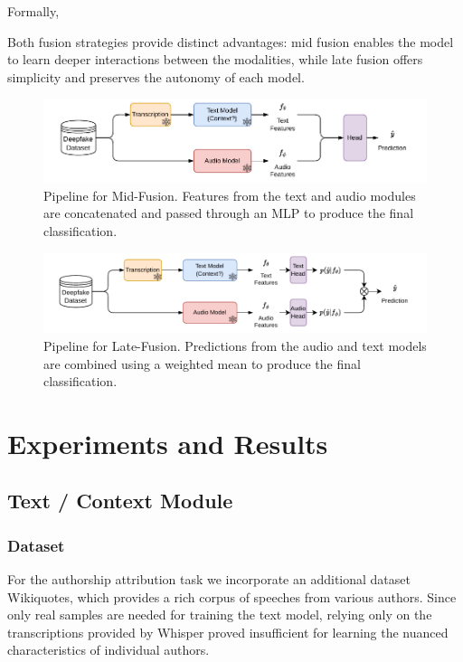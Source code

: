 \documentclass{Interspeech}
\begin{document}
Formally, 

Both fusion strategies provide distinct advantages: mid fusion enables the
model to learn deeper interactions between the modalities, while late fusion
offers simplicity and preserves the autonomy of each model.

\begin{figure}[t]
  \centering
  \includegraphics[width=1\textwidth]{figures/mid_fusion.pdf}
  \caption{Pipeline for Mid-Fusion. Features from the text and audio modules are concatenated and passed through an MLP to produce the final classification.}\label{fig:mid_fusion}
\end{figure}

\begin{figure}[t]
  \centering
  \includegraphics[width=1\textwidth]{figures/late_fusion.pdf}
  \caption{Pipeline for Late-Fusion. Predictions from the audio and text models are combined using a weighted mean to produce the final classification.}\label{fig:late_fusion} 
\end{figure}

\section{Experiments and Results}


\subsection{Text / Context Module}
\subsubsection{Dataset}
For the authorship attribution task we incorporate an additional dataset
Wikiquotes, which provides a rich corpus of speeches from various authors.
Since only real samples are needed for training the text model, relying only on
the transcriptions provided by Whisper proved insufficient for learning the
nuanced characteristics of individual authors. \\
\end{document}
